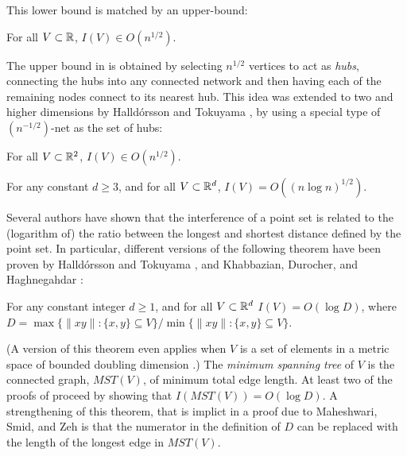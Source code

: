 \documentclass{patmorin}
\newcommand{\mst}{\mathit{MST}}
\begin{document}
This lower bound is matched by an upper-bound:
\begin{thm}
For all $V\subset\mathbb{R}$, $I(V)\in O(n^{1/2})$.
\end{thm}
The upper bound in  is obtained by selecting $n^{1/2}$
vertices to act as \emph{hubs}, connecting the hubs into any connected
network and then having each of the remaining nodes connect to its
nearest hub.  This idea was extended to two and higher dimensions
by Halld\'orsson and Tokuyama \cite{ht08}, by using a special type of
$(n^{-1/2})$-net as the set of hubs:
\begin{thm}
For all $V\subset\mathbb{R}^2$, $I(V)\in O(n^{1/2})$.  
\end{thm}
\begin{thm}
  For any constant $d\ge 3$, and for all $V\subset\mathbb{R}^d$, $I(V)=O((n\log
  n)^{1/2})$.
\end{thm}

Several authors have shown that the interference of a point set is
related to the (logarithm of) the ratio between the longest and shortest
distance defined by the point set.  In particular, different versions
of the following theorem have been proven by Halld\'orsson and Tokuyama
\cite{ht08}, and Khabbazian, Durocher, and Haghnegahdar
\cite{kdh11}:
\begin{thm}
  For any constant integer $d\ge 1$, and for all $V\subset\mathbb{R}^d$
  $I(V)=O(\log D)$, where $D=\max\{\|xy\|: \{x,y\}\subseteq V\}/\min\{\|xy\|:
  \{x,y\}\subseteq V\}$.
\end{thm}
(A version of this theorem even applies when $V$ is a set of elements
in a metric space of bounded doubling dimension \cite{msz11}.)  The
\emph{minimum spanning tree} of $V$ is the connected graph, $\mst(V)$,
of minimum total edge length.  At least two of the proofs of 
proceed by showing that $I(\mst(V))=O(\log D)$.  A strengthening of
this theorem, that is implict in a proof due to Maheshwari, Smid, and
Zeh \cite{msz11} is that the numerator in the definition of $D$ can be
replaced with the length of the longest edge in $\mst(V)$.
\end{document}
